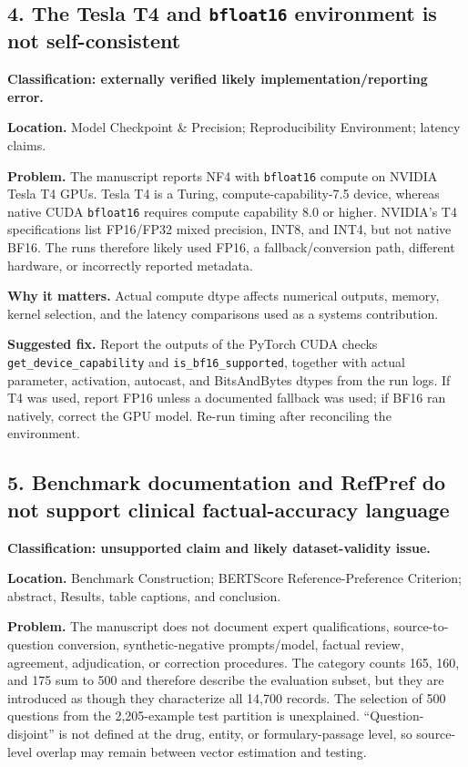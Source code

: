 \documentclass[11pt]{article}
\begin{document}
\subsection*{4. The Tesla T4 and \texttt{bfloat16} environment is not self-consistent}

\textbf{Classification: externally verified likely implementation/reporting error.}

\textbf{Location.} Model Checkpoint \& Precision; Reproducibility Environment; latency claims.

\textbf{Problem.} The manuscript reports NF4 with \texttt{bfloat16} compute on NVIDIA Tesla T4 GPUs.  Tesla T4 is a Turing, compute-capability-7.5 device, whereas native CUDA \texttt{bfloat16} requires compute capability 8.0 or higher.  NVIDIA's T4 specifications list FP16/FP32 mixed precision, INT8, and INT4, but not native BF16.  The runs therefore likely used FP16, a fallback/conversion path, different hardware, or incorrectly reported metadata.

\textbf{Why it matters.} Actual compute dtype affects numerical outputs, memory, kernel selection, and the latency comparisons used as a systems contribution.

\textbf{Suggested fix.} Report the outputs of the PyTorch CUDA checks \texttt{get\_device\_capability} and \texttt{is\_bf16\_supported}, together with actual parameter, activation, autocast, and BitsAndBytes dtypes from the run logs.  If T4 was used, report FP16 unless a documented fallback was used; if BF16 ran natively, correct the GPU model.  Re-run timing after reconciling the environment.

\subsection*{5. Benchmark documentation and RefPref do not support clinical factual-accuracy language}

\textbf{Classification: unsupported claim and likely dataset-validity issue.}

\textbf{Location.} Benchmark Construction; BERTScore Reference-Preference Criterion; abstract, Results, table captions, and conclusion.

\textbf{Problem.} The manuscript does not document expert qualifications, source-to-question conversion, synthetic-negative prompts/model, factual review, agreement, adjudication, or correction procedures.  The category counts 165, 160, and 175 sum to 500 and therefore describe the evaluation subset, but they are introduced as though they characterize all 14,700 records.  The selection of 500 questions from the 2,205-example test partition is unexplained.  ``Question-disjoint'' is not defined at the drug, entity, or formulary-passage level, so source-level overlap may remain between vector estimation and testing.
\end{document}
